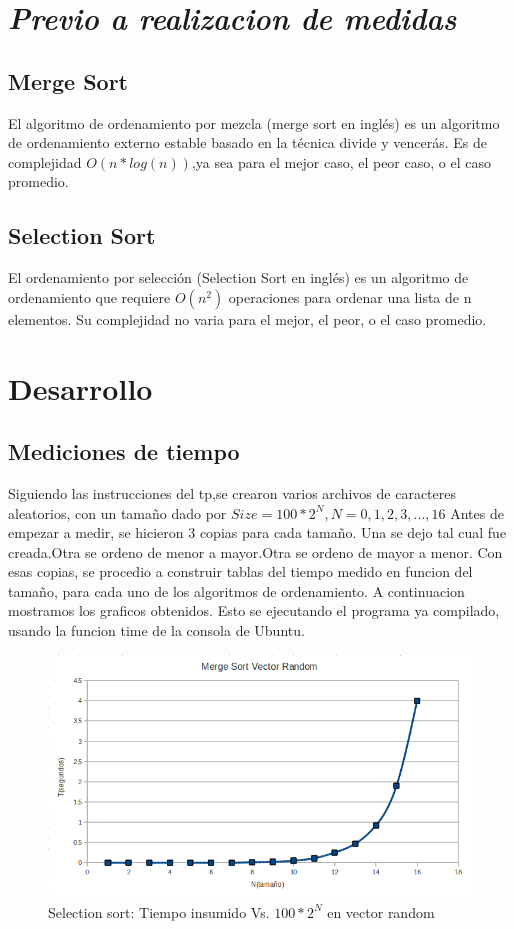 \section{\emph{Previo a realizacion de medidas}}
\subsection{Merge Sort}
El algoritmo de ordenamiento por mezcla (merge sort en inglés) es un algoritmo de ordenamiento externo estable basado en la técnica divide y vencerás.
Es de complejidad $O(n*log(n))$,ya sea para el mejor caso, el peor caso, o el caso promedio.

\subsection{Selection Sort}
El ordenamiento por selección (Selection Sort en inglés) es un algoritmo de ordenamiento que requiere $O(n^2)$ operaciones para ordenar una lista de n elementos.
Su complejidad no varia para el mejor, el peor, o el caso promedio.

\section{Desarrollo}
\subsection{Mediciones de tiempo}
Siguiendo las instrucciones del tp,se crearon varios archivos de caracteres aleatorios, 
con un tamaño dado por $Size = 100*2^N , N=0,1,2,3, \dots ,16$
Antes de empezar a medir, se hicieron 3 copias para cada tamaño.
Una se dejo tal cual fue creada.Otra se ordeno de menor a mayor.Otra se ordeno de mayor a menor.
Con esas copias, se procedio a construir tablas del tiempo medido en funcion del tamaño, para cada uno
de los algoritmos de ordenamiento.
A continuacion mostramos los graficos obtenidos.
Esto se ejecutando el programa ya compilado, usando la funcion time de la consola de Ubuntu.

\begin{figure}[p]
  \centering
 \includegraphics[width=13cm]{Imagenes/MergeSortVectorRandom.PNG}
  \caption{Selection sort: Tiempo insumido Vs. $100*2^N$ en vector random}
  \label{fig:seleccion:ord}
\end{figure}


